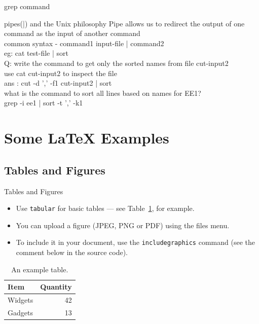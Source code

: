 \documentclass{beamer}
\begin{document}
{\begin{frame}{grep command}
\end{frame}
\begin{frame}{pipes(|) and the Unix philosophy}
	Pipe allows us to redirect the output of one command as the input of another command\\ 
	common syntax -   command1 input-file | command2 \\
	eg: cat test-file | sort \\
	Q: write the command to get only the sorted names from file cut-input2\\
	use cat cut-input2 to inspect the file\\ \pause
	ans : cut -d ',' -f1 cut-input2 | sort \\
	what is the command to sort all lines based on names for EE1?\\ \pause
	grep -i ee1 | sort -t ',' -k1 


\end{frame}
}
\section{Some \LaTeX{} Examples}

\subsection{Tables and Figures}

\begin{frame}{Tables and Figures}

\begin{itemize}
\item Use \texttt{tabular} for basic tables --- see Table~\ref{tab:widgets}, for example.
\item You can upload a figure (JPEG, PNG or PDF) using the files menu. 
\item To include it in your document, use the \texttt{includegraphics} command (see the comment below in the source code).
\end{itemize}


\begin{table}
\centering
\begin{tabular}{l|r}
Item & Quantity \\\hline
Widgets & 42 \\
Gadgets & 13
\end{tabular}
\caption{\label{tab:widgets}An example table.}
\end{table}

\end{frame}
\end{document}
